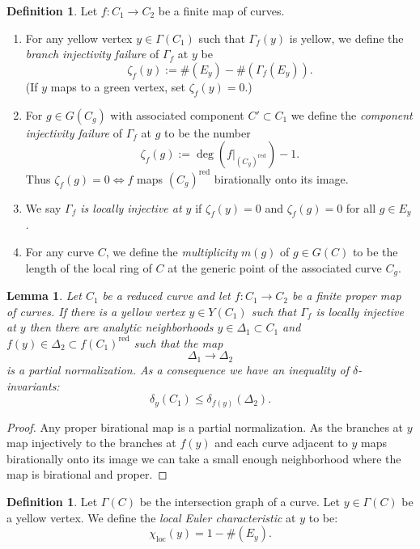 \documentclass[JEP,XML,SOM,Unicode,NoFloatCountersInSection,published]{cedram}
\theoremstyle{plain}
\newtheorem{lemma}[theorem]{Lemma}
\theoremstyle{definition}
\newtheorem{definition}[theorem]{Definition}
\newcommand\loc{{\mathrm{loc}}}
\newcommand\cl{{\colon}}
\begin{document}
\begin{definition}
Let $f\cl C_1\to C_2$ be a finite map of curves.

\begin{enumerate}
\item For any yellow vertex $y \in \Gamma(C_1)$ such that $\Gamma_f(y)$ is yellow, we define the \textit{branch injectivity failure} of $\Gamma_f$ at $y$ be\vspace*{-3pt}
\[
\zeta_f(y) := \#(E_y)-\#(\Gamma_f(E_y)).
\]
(If $y$ maps to a green vertex, set $\zeta_f(y)=0$.)
\item For $g\in G(C_g)$ with associated component $C'\subset C_1$ we define the \textit{component injectivity failure} of $\Gamma_f$ at $g$ to be the number\vspace*{-3pt}
\[
\zeta_f(g) := \deg\left(f|_{(C_g)^\mathrm{red}}\right) - 1.
\]
Thus $\zeta_f(g) = 0 \iff f$ maps $(C_g)^\mathrm{red}$ birationally onto its image.
\item We say \textit{$\Gamma_f$ is locally injective at $y$} if $\zeta_f(y) = 0$ and $\zeta_f(g) = 0$ for all $g\in E_y$.
\item For any curve $C$, we define the \textit{multiplicity} $m(g)$ of $g\in G(C)$ to be the length of the local ring of $C$ at the generic point of the associated curve $C_g$.
\end{enumerate}
\end{definition}

\begin{lemma}\label{deltaif}
Let $C_1$ be a reduced curve and let $f\cl C_1\to C_2$ be a finite proper map of curves. If there is a yellow vertex $y\in Y(C_1)$ such that $\Gamma_f$ is locally injective at $y$ then there are analytic neighborhoods $y\in \Delta_1\subset C_1$ and $f(y) \in \Delta_2\subset f(C_1)^\mathrm{red}$ such that the map
\[
\Delta_1\to \Delta_2
\]
is a partial normalization. As a consequence we have an inequality of $\delta$-invariants:
\[
\delta_y(C_1) \le \delta_{f(y)}(\Delta_2).
\]
\end{lemma}

\begin{proof}
Any proper birational map is a partial normalization. As the branches at $y$ map injectively to the branches at $f(y)$ and each curve adjacent to $y$ maps birationally onto its image we can take a small enough neighborhood where the map is birational and proper.
\end{proof}

\begin{definition}
Let $\Gamma(C)$ be the intersection graph of a curve. Let $y\in \Gamma(C)$ be a yellow vertex. We define the \textit{local Euler characteristic} at $y$ to be:
\[
\chi_\loc(y) = 1-\#(E_y).
\]
\end{definition}
\end{document}
